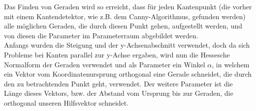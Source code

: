\documentclass[12pt,a4paper,ngerman]{scrartcl}
\begin{document}
Das Finden von Geraden wird so erreicht, dass für jeden Kantenpunkt (die vorher mit einem Kantendetektor, wie z.B. dem Canny-Algorithmus, gefunden werden) alle möglichen Geraden, die durch diesen Punkt gehen, aufgestellt werden, und von diesen die Parameter im Parameterraum abgebildet werden.\\
Anfangs wurden die Steigung und der y-Achsenabschnitt verwendet, doch da sich Probleme bei Kanten parallel zur y-Achse ergaben, wird nun die Hessesche Normalform der Geraden verwendet und als Parameter ein Winkel $\alpha$, in welchem ein Vektor vom Koordinatenursprung orthogonal eine Gerade schneidet, die durch den zu betrachtenden Punkt geht, verwendet. Der weitere Parameter ist die Länge dieses Vektors, bzw. der Abstand vom Ursprung bis zur Geraden, die orthogonal unseren Hilfsvektor schneidet.
\end{document}
